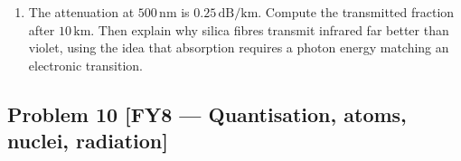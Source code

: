 \documentclass[11pt,a4paper]{article}
\newcommand{\problem}[3]{%
  \subsection*{Problem #1 \;\textnormal{\small[#2]}}\label{prob:#3}%
}
\newcommand{\unit}[1]{\,\mathrm{#1}}
\newenvironment{parts}{\begin{enumerate}[label=\textbf{\alph*)}]}{\end{enumerate}}
\begin{document}
\begin{parts}
\begin{enumerate}[label=\roman*.]
            length in $1.00\unit{m}$ of fibre and the time delay per kilometre
            relative to the axial ray. Why does this effect limit the bit rate
            of a step-index fibre, and what does a graded-index core do about
            it?
      \item The attenuation at $500\unit{nm}$ is $0.25\unit{dB/km}$. Compute
            the transmitted fraction after $10\unit{km}$. Then explain why
            silica fibres transmit infrared far better than violet, using the
            idea that absorption requires a photon energy matching an
            electronic transition.
      \end{enumerate}
\end{parts}

\problem{10}{FY8 --- Quantisation, atoms, nuclei, radiation}{fy8}
\end{document}
